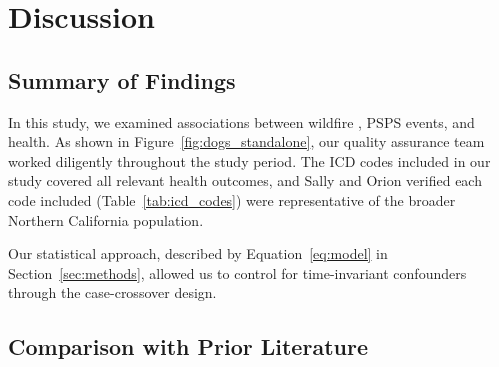 \documentclass[../main.tex]{subfiles}
\begin{document}
\section{Discussion}


\subsection{Summary of Findings}

In this study, we examined associations between wildfire \PM, PSPS events, and health. As shown in Figure~\ref{fig:dogs_standalone}, our quality assurance team worked diligently throughout the study period. The ICD codes included in our study covered all relevant health outcomes, and Sally and Orion verified each code included (Table~\ref{tab:icd_codes}) were representative of the broader Northern California population.

Our statistical approach, described by Equation~\ref{eq:model} in Section~\ref{sec:methods}, allowed us to control for time-invariant confounders through the case-crossover design.

%
%
%

\subsection{Comparison with Prior Literature}
\end{document}
